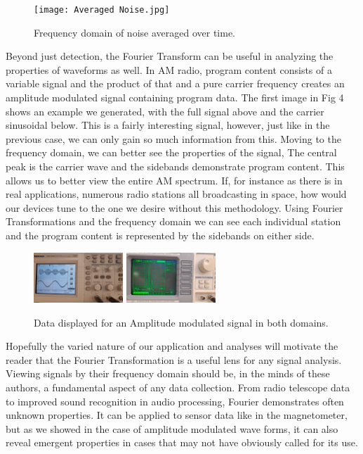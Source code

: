 \documentclass[prl,twocolumn,superscriptaddress,floatfix]{revtex4}
\begin{document}
\begin{figure}[H]
\begin{center}
\texttt{[image: Averaged Noise.jpg]}
\label{averagenoise}
\caption{Frequency domain of noise averaged over time.}
\end{center}
\end{figure}

Beyond just detection, the Fourier Transform can be useful in analyzing the properties of waveforms as well.
In AM radio, program content consists of a variable signal and the product of that and a pure carrier frequency creates an amplitude modulated signal containing program data.
The first image in Fig 4 shows an example we generated, with the full signal above and the carrier sinusoidal below.
This is a fairly interesting signal, however, just like in the previous case, we can only gain so much information from this.
Moving to the frequency domain, we can better see the properties of the signal, The central peak is the carrier wave and the sidebands demonstrate program content.
This allows us to better view the entire AM spectrum. If, for instance as there is in real applications, numerous radio stations all broadcasting in space, how would our devices tune to the one we desire without this methodology. 
Using Fourier Transformations and the frequency domain we can see each individual station and the program content is represented by the sidebands on either side. 

\begin{figure}[H]
\begin{center}
\includegraphics[width = 0.3\textwidth]{AM data, Time.jpg}
\includegraphics[width = 0.3\textwidth]{AM data, Freq.jpg}
\label{amsignal}
\caption{Data displayed for an Amplitude modulated signal in both domains.}
\end{center}
\end{figure}

Hopefully the varied nature of our application and analyses will motivate the reader that the Fourier Transformation is a useful lens for any signal analysis.
Viewing signals by their frequency domain should be, in the minds of these authors, a fundamental aspect of any data collection.
From radio telescope data to improved sound recognition in audio processing, Fourier demonstrates often unknown properties.
It can be applied to sensor data like in the magnetometer, but as we showed in the case of amplitude modulated wave forms, it can also reveal emergent properties in cases that may not have obviously called for its use.

\cite{Butz2015,James2011}

\end{document}
